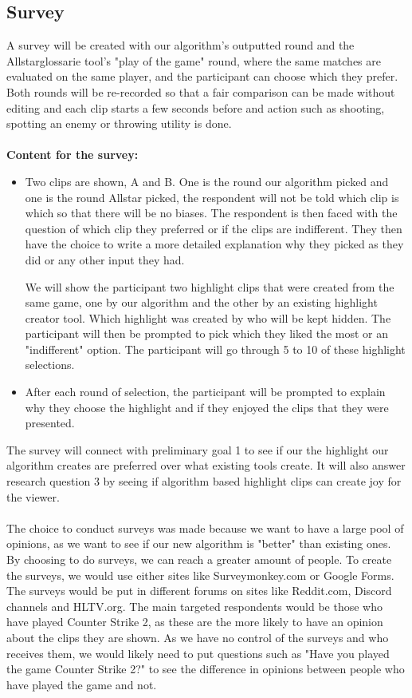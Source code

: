 \documentclass[a4paper,twoside]{bth}
\begin{document}
\subsection{Survey}
\label{sec:survey}
A survey will be created with our algorithm's outputted round and the Allstar{glossarie} tool's "play of the game" round, where the same matches are evaluated on the same player, and the participant can choose which they prefer. Both rounds will be re-recorded so that a fair comparison can be made without editing and each clip starts a few seconds before and action such as shooting, spotting an enemy or throwing utility is done. \\\\
\textbf {Content for the survey:}
\begin{itemize}
    \item Two clips are shown, A and B. One is the round our algorithm picked and one is the round Allstar picked, the respondent will not be told which clip is which so that there will be no biases. The respondent is then faced with the question of which clip they preferred or if the clips are indifferent. They then have the choice to write a more detailed explanation why they picked as they did or any other input they had.
    
    We will show the participant two highlight clips that were created from the same game, one by our algorithm and the other by an existing highlight creator tool. Which highlight was created by who will be kept hidden. The participant will then be prompted to pick which they liked the most or an "indifferent" option. The participant will go through 5 to 10 of these highlight selections. 
    \item After each round of selection, the participant will be prompted to explain why they choose the highlight and if they enjoyed the clips that they were presented.  
\end{itemize}
The survey will connect with preliminary goal 1 to see if our the highlight our algorithm creates are preferred over what existing tools create. It will also answer research question 3 by seeing if algorithm based highlight clips can create joy for the viewer.\\\\
The choice to conduct surveys was made because we want to have a large pool of opinions, as we want to see if our new algorithm is "better" than existing ones. By choosing to do surveys, we can reach a greater amount of people. To create the surveys, we would use either sites like Surveymonkey.com or Google Forms. The surveys would be put in different forums on sites like Reddit.com, Discord channels and HLTV.org. The main targeted respondents would be those who have played Counter Strike 2, as these are the more likely to have an opinion about the clips they are shown. As we have no control of the surveys and who receives them, we would likely need to put questions such as "Have you played the game Counter Strike 2?" to see the difference in opinions between people who have played the game and not.\\\\
\end{document}

